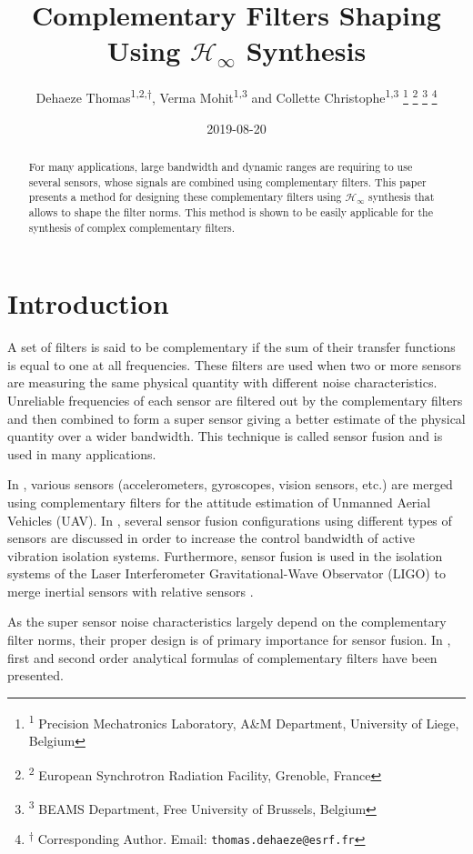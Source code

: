 \documentclass[letterpaper, 10 pt, conference]{ieeeconf}
\author{Dehaeze Thomas\textsuperscript{1,2,$\dagger$}, Verma Mohit\textsuperscript{1,3} and Collette Christophe\textsuperscript{1,3}  \thanks{\textsuperscript{1} Precision Mechatronics Laboratory, A\&M Department, University of Liege, Belgium} \thanks{\textsuperscript{2} European Synchrotron Radiation Facility, Grenoble, France} \thanks{\textsuperscript{3} BEAMS Department, Free University of Brussels, Belgium} \thanks{\textsuperscript{$\dagger$} Corresponding Author. Email: {\tt\small thomas.dehaeze@esrf.fr}}}
\date{2019-08-20}
\title{Complementary Filters Shaping Using \(\mathcal{H}_\infty\) Synthesis}
\begin{document}
\maketitle


\begin{abstract}
For many applications, large bandwidth and dynamic ranges are requiring to use several sensors, whose signals are combined using complementary filters.
This paper presents a method for designing these complementary filters using \(\mathcal{H}_\infty\) synthesis that allows to shape the filter norms.
This method is shown to be easily applicable for the synthesis of complex complementary filters.
\end{abstract}

\section{Introduction}
\label{sec:orgf075900}
\label{sec:introduction}
A set of filters is said to be complementary if the sum of their transfer functions is equal to one at all frequencies.
These filters are used when two or more sensors are measuring the same physical quantity with different noise characteristics. Unreliable frequencies of each sensor are filtered out by the complementary filters and then combined to form a super sensor giving a better estimate of the physical quantity over a wider bandwidth.
This technique is called sensor fusion and is used in many applications.\par
In \cite{zimmermann92_high_bandw_orien_measur_contr,corke04_inert_visual_sensin_system_small_auton_helic,min15_compl_filter_desig_angle_estim}, various sensors (accelerometers, gyroscopes, vision sensors, etc.) are merged using complementary filters for the attitude estimation of Unmanned Aerial Vehicles (UAV).
In \cite{collette15_sensor_fusion_method_high_perfor}, several sensor fusion configurations using different types of sensors are discussed in order to increase the control bandwidth of active vibration isolation systems.
Furthermore, sensor fusion is used in the isolation systems of the Laser Interferometer Gravitational-Wave Observator (LIGO) to merge inertial sensors with relative sensors
\cite{matichard15_seism_isolat_advan_ligo,hua04_polyp_fir_compl_filter_contr_system}. \par
As the super sensor noise characteristics largely depend on the complementary filter norms, their proper design is of primary importance for sensor fusion.
In \cite{corke04_inert_visual_sensin_system_small_auton_helic,jensen13_basic_uas,min15_compl_filter_desig_angle_estim}, first and second order analytical formulas of complementary filters have been presented.
\end{document}
